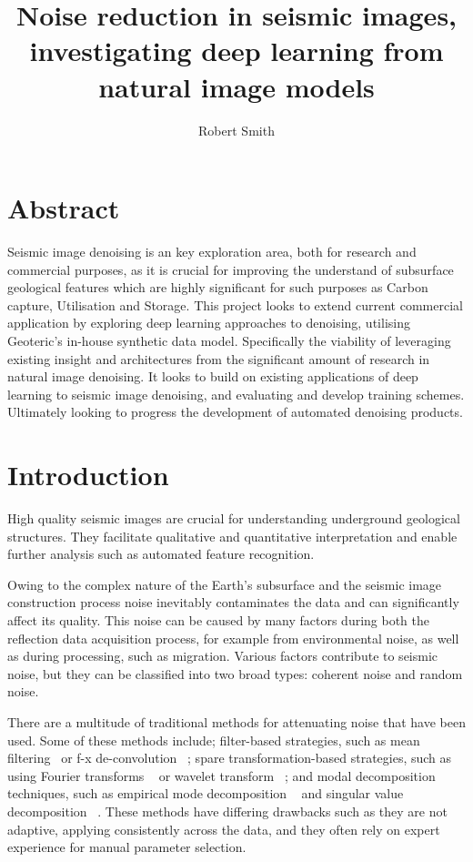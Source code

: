 \documentclass[project-plan]{report-template}
\title{Noise reduction in seismic images, investigating deep learning from natural image models}
\author{Robert Smith}
\begin{document}
\maketitlepage  %

\section*{Abstract}
Seismic image denoising is an key exploration area, both for research and commercial purposes, as it is crucial for improving the understand of subsurface geological features which are highly significant for such purposes as Carbon capture, Utilisation and Storage. This project looks to extend current commercial application by exploring deep learning approaches to denoising, utilising Geoteric's in-house synthetic data model. Specifically the viability of leveraging existing insight and architectures from the significant amount of research in natural image denoising. It looks to build on existing applications of deep learning to seismic image denoising, and evaluating and develop training schemes. Ultimately looking to progress the development of automated denoising products.

\newpage
\tableofcontents
\newpage

\section{Introduction}
High quality seismic images are crucial for understanding underground geological structures. They facilitate qualitative and quantitative interpretation and enable further analysis such as automated feature recognition.

Owing to the complex nature of the Earth's subsurface and the seismic image construction process noise inevitably contaminates the data and can significantly affect its quality. This noise can be caused by many factors during both the reflection data acquisition process, for example from environmental noise, as well as during processing, such as migration. Various factors contribute to seismic noise, but they can be classified into two broad types: coherent noise and random noise. 

There are a multitude of traditional methods for attenuating noise that have been used. Some of these methods include; filter-based strategies, such as mean filtering~\cite{Liu20062d} or f-x de-convolution ~\cite{hornbostel1991spatial}; spare transformation-based strategies, such as using Fourier transforms ~\cite{alsdorf1997noise} or wavelet transform ~\cite{Albert2009wavelet}; and modal decomposition techniques, such as empirical mode decomposition ~\cite{bekara2009random} and singular value decomposition ~\cite{bekara2007local}. These methods have differing drawbacks such as they are not adaptive, applying consistently across the data, and they often rely on expert experience for manual parameter selection.
\end{document}
